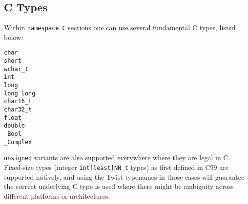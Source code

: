\documentclass[a4paper,11pt]{report}
\newcommand{\tcode}[1]{\texttt{#1}}
\begin{document}
\subsection{C Types} \label{app:c_types}
Within \tcode{namespace C} sections one can use several fundamental C types, listed below:
\begin{lstlisting}
char
short
wchar_t
int
long
long long
char16_t
char32_t
float
double
_Bool
_Complex
\end{lstlisting}
\tcode{unsigned} variants are also supported everywhere where they are legal in C.
Fixed-size types (integer \tcode{int[least]NN\_t} types) as first defined in C99 are supported natively, and using the Twist typenames in those cases will guarantee the correct underlying C type is used where there might be ambiguity across different platforms or architectures.
\end{document}

